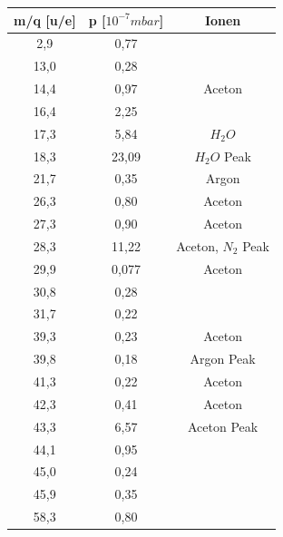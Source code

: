 \begin{center}
\begin{tabular}{c|c|c}
m/q [u/e] & p [$10^{-7} mbar$] & Ionen\\	
\hline	
2,9 &	0,77 &\\
13,0 &	0,28 &\\
14,4 &	0,97 & Aceton\\
16,4 &	2,25 &\\
17,3 &	5,84 & $H_2O$\\
18,3 &	23,09 & $H_2O$ Peak\\
21,7 &	0,35 & Argon\\
26,3 &	0,80 & Aceton\\
27,3 &	0,90 & Aceton\\
28,3 &	11,22 & Aceton, $N_2$ Peak\\
29,9 &	0,077 & Aceton\\
30,8 &	0,28 &\\
31,7 &	0,22 &\\
39,3 &	0,23 & Aceton\\
39,8 &	0,18 & Argon Peak\\
41,3 &	0,22 & Aceton\\
42,3 &	0,41 & Aceton\\
43,3 &	6,57 & Aceton Peak\\
44,1 &	0,95 &\\
45,0 &	0,24 &\\
45,9 &	0,35 &\\
58,3 &	0,80 &\\
\end{tabular}
\end{center}


